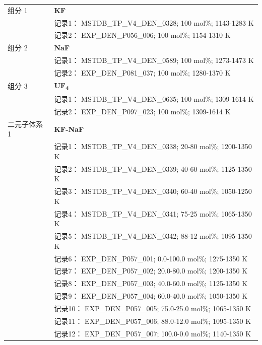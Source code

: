 \documentclass[12pt]{article}
\begin{document}
{\begin{longtable}[]{@{}
  >{\raggedright\arraybackslash}p{}
  >{\raggedright\arraybackslash}p{}@{}}
组分 1  & \textbf{KF} \\
 & 记录1： MSTDB\_TP\_V4\_DEN\_0328; 100 mol\%; 1143-1283 K \\
 & 记录2： EXP\_DEN\_P056\_006; 100 mol\%; 1154-1310 K  \\

组分 2  & \textbf{NaF} \\
 & 记录1： MSTDB\_TP\_V4\_DEN\_0589; 100 mol\%; 1273-1473 K \\
 & 记录2： EXP\_DEN\_P081\_037; 100 mol\%; 1280-1370 K  \\

组分 3  & \textbf{UF\textsubscript{4}} \\
 & 记录1： MSTDB\_TP\_V4\_DEN\_0635; 100 mol\%; 1309-1614 K \\
 & 记录2： EXP\_DEN\_P097\_023; 100 mol\%; 1309-1614 K  \\

二元子体系 1  & \textbf{KF-NaF} \\
 & 记录1： MSTDB\_TP\_V4\_DEN\_0338; 20-80 mol\%; 1200-1350 K \\
 & 记录2： MSTDB\_TP\_V4\_DEN\_0339; 40-60 mol\%; 1125-1350 K \\
 & 记录3： MSTDB\_TP\_V4\_DEN\_0340; 60-40 mol\%; 1050-1250 K \\
 & 记录4： MSTDB\_TP\_V4\_DEN\_0341; 75-25 mol\%; 1065-1350 K \\
 & 记录5： MSTDB\_TP\_V4\_DEN\_0342; 88-12 mol\%; 1095-1350 K \\
 & 记录6： EXP\_DEN\_P057\_001; 0.0-100.0 mol\%; 1275-1350 K \\
 & 记录7： EXP\_DEN\_P057\_002; 20.0-80.0 mol\%; 1200-1350 K \\
 & 记录8： EXP\_DEN\_P057\_003; 40.0-60.0 mol\%; 1125-1350 K \\
 & 记录9： EXP\_DEN\_P057\_004; 60.0-40.0 mol\%; 1050-1350 K \\
 & 记录10： EXP\_DEN\_P057\_005; 75.0-25.0 mol\%; 1065-1350 K \\
 & 记录11： EXP\_DEN\_P057\_006; 88.0-12.0 mol\%; 1095-1350 K \\
 & 记录12： EXP\_DEN\_P057\_007; 100.0-0.0 mol\%; 1140-1350 K  \\


\end{longtable}}
\end{document}
